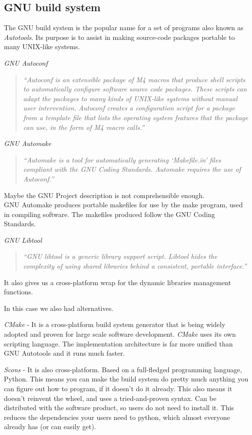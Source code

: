 \subsection{GNU build system}
The GNU build system is the popular name for a set of programs also known as \emph{Autotools}. Its purpose is to assist in making 
source-code packages portable to many UNIX-like systems.
\begin{list}{-}{This set is formed by:}
  \item \emph{GNU Autoconf}\cite{gnu:autoconf}\\
    \begin{quote}
      \emph{``Autoconf is an extensible package of M4 macros that produce shell scripts to automatically configure software source code 
	packages. These scripts can adapt the packages to many kinds of UNIX-like systems without manual user intervention. Autoconf 
	creates a configuration script for a package from a template file that lists the operating system features that the package can 
	use, in the form of M4 macro calls.''}
    \end{quote}
  \item \emph{GNU Automake}\cite{gnu:automake}
    \begin{quote}
      \emph{``Automake is a tool for automatically generating `Makefile.in' files compliant with the GNU Coding Standards. Automake 
	requires the use of Autoconf.''}
    \end{quote}
    Maybe the GNU Project description is not comprehensible enough.\\
    GNU Automake produces portable makefiles for use by the make program, used in compiling software. The makefiles produced follow the 
    GNU Coding Standards.
  \item \emph{GNU Libtool}\cite{gnu:libtool}
    \begin{quote}
      \emph{``GNU libtool is a generic library support script. Libtool hides the complexity of using shared libraries behind a consistent, 
	portable interface.''}
    \end{quote}
    It also gives us a cross-platform wrap for the dynamic libraries management functions.
\end{list}
In this case we also had alternatives. 
\begin{list}{-}{This set is formed by:}
  \item \emph{CMake} - It is a cross-platform build system generator that is being widely adopted and proven for large scale software 
    development.
    \emph{CMake} uses its own scripting language. The implementation architecture is far more unified than GNU Autotools and it runs much 
    faster.
  \item \emph{Scons} - It is also cross-platform. Based on a full-fledged programming language, Python. This means you can make the build 
    system do pretty much anything you can figure out how to program, if it doesn't do it already. This also means it doesn't reinvent the 
    wheel, and uses a tried-and-proven syntax. Can be distributed with the software product, so users do not need to install it. This 
    reduces the dependencies your users need to python, which almost everyone already has (or can easily get).
\end{list}
